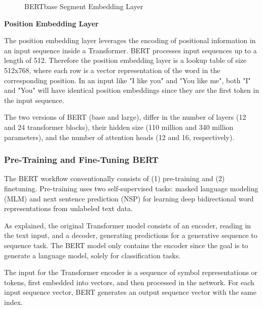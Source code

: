 \begin{figure}
    \caption{BERTbase Segment Embedding Layer}
    \label{fig:BERT_segmentEmbedding}
\end{figure}


\textbf{Position Embedding Layer}

The position embedding layer leverages the encoding of positional information in an input sequence inside a Transformer. BERT processes input sequences up to a length of 512. Therefore the position embedding layer is a lookup table of size 512x768, where each row is a vector representation of the word in the corresponding position. In an input like "I like you" and "You like me", both "I" and "You" will have identical position embeddings since they are the first token in the input sequence. 

The two versions of BERT (base and large), differ in the number of layers (12 and 24 transformer blocks), their hidden size (110 million and 340 million parameters), and the number of attention heads (12 and 16, respectively).

\subsubsection{Pre-Training and Fine-Tuning BERT}
\label{sec:bert_pre-fine}
The BERT workflow conventionally consists of (1) pre-training and (2) finetuning. Pre-training uses two self-supervised tasks: masked language modeling (MLM) and next sentence prediction (NSP) for learning deep bidirectional word representations from unlabeled text data.

As explained, the original Transformer model consists of an encoder, reading in the text input, and a decoder, generating predictions for a generative sequence to sequence task. The BERT model only contains the encoder since the goal is to generate a language model, solely for classification tasks.

The input for the Transformer encoder is a sequence of symbol representations or tokens, first embedded into vectors, and then processed in the network. For each input sequence vector, BERT generates an output sequence vector with the same index.

